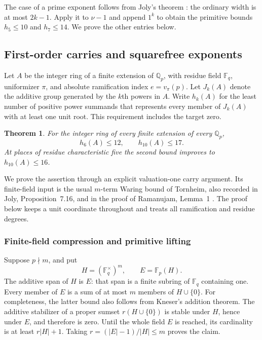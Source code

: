 \documentclass[11pt]{amsart}
\newtheorem{theorem}{Theorem}[section]
\theoremstyle{definition}
\numberwithin{equation}{section}
\begin{document}
The case of a prime exponent follows from Joly's theorem
\cite[Theorem~7.34]{Joly1970}: the ordinary width is at most
$2k-1$. Apply it to $\nu-1$ and append $1^k$ to obtain the
primitive bounds $h_5\le10$ and $h_7\le14$. We prove the other
entries below.
\subsection{First-order carries and squarefree exponents}
\label{sec:valuation-one-carries}


Let $A$ be the integer ring of a finite extension of $\mathbb Q_p$,
with residue field $\mathbb F_q$, uniformizer $\pi$, and absolute
ramification index $e=v_\pi(p)$. Let $J_k(A)$ denote the additive
group generated by the $k$th powers in $A$. Write $h_k(A)$ for the
least number of positive power summands that represents every member
of $J_k(A)$ with at least one unit root. This requirement includes
the target zero.

\begin{theorem}\label{thm:carry-sixth-tenth}
For the integer ring of every finite extension of every $\mathbb Q_p$,
\[
 h_6(A)\le12,\qquad h_{10}(A)\le17.
\]
At places of residue characteristic five the second bound improves
to $h_{10}(A)\le16$.
\end{theorem}

We prove the assertion through an explicit valuation-one carry
argument. Its finite-field input is the usual $m$-term Waring bound
of Tornheim, also recorded in Joly, Proposition~7.16, and in the
proof of Ramanujam, Lemma~1 \cite{Joly1970,Ramanujam1963}.
The proof below keeps a unit coordinate throughout and treats all
ramification and residue degrees.

\subsubsection{Finite-field compression and primitive lifting}

Suppose $p\nmid m$, and put
\[
 H=(\mathbb F_q^\times)^m,
 \qquad E=\mathbb F_p(H).
\]
The additive span of $H$ is $E$: that span is a finite subring of
$\mathbb F_q$ containing one. Every member of $E$ is a sum of at
most $m$ members of $H\cup\{0\}$.
For completeness, the latter bound also follows from Kneser's
addition theorem. The additive stabilizer of a proper sumset
$r(H\cup\{0\})$ is stable under $H$, hence under $E$, and therefore
is zero. Until the whole field $E$ is reached, its cardinality is
at least $r|H|+1$. Taking $r=(|E|-1)/|H|\le m$ proves the claim.
\end{document}
